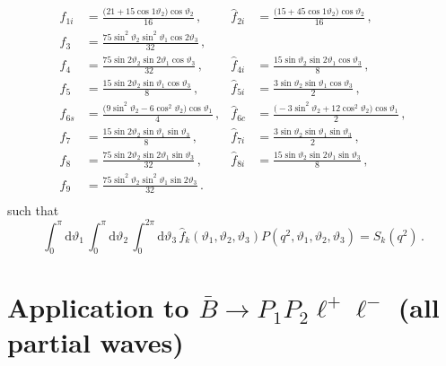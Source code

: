\documentclass[aps,prd,reprint,nofootinbib,preprintnumbers]{revtex4}
\newcommand{\rmdx}[1]{\mbox{d} #1 \,} %
\renewcommand{\theta}{\vartheta}
\begin{document}
\begin{equation}
\begin{aligned}
    \hat{f}_{1i} & = \frac{\big(21 + 15 \cos1\theta_2\big)\cos\theta_2}{16}               \,,&
    \hat{f}_{2i} & = \frac{\big(15 + 45 \cos1\theta_2\big)\cos\theta_2}{16}               \,,\\
    \hat{f}_{3}  & = \frac{75 \sin^2\theta_2 \sin^2\theta_1 \cos2\theta_3}{32}                \,,& &\\
    \hat{f}_{4}  & = \frac{75 \sin 2\theta_2 \sin 2\theta_1 \cos \theta_3}{32}                \,,&
    \hat{f}_{4i} & = \frac{15 \sin  \theta_2 \sin 2\theta_1 \cos \theta_3}{8}                 \,,\\
    \hat{f}_{5}  & = \frac{15 \sin 2\theta_2 \sin  \theta_1 \cos \theta_3}{8}                 \,,&
    \hat{f}_{5i} & = \frac{3  \sin  \theta_2 \sin  \theta_1 \cos \theta_3}{2}                 \,,\\
    \hat{f}_{6s} & = \frac{\big( 9\sin^2\theta_2 -  6 \cos^2\theta_2\big)\cos\theta_1}{4} \,,&
    \hat{f}_{6c} & = \frac{\big(-3\sin^2\theta_2 + 12 \cos^2\theta_2\big)\cos\theta_1}{2} \,,\\
    \hat{f}_{7}  & = \frac{15 \sin 2\theta_2 \sin  \theta_1 \sin \theta_3}{8}                 \,,&
    \hat{f}_{7i} & = \frac{3  \sin  \theta_2 \sin  \theta_1 \sin \theta_3}{2}                 \,,\\
    \hat{f}_{8}  & = \frac{75 \sin 2\theta_2 \sin 2\theta_1 \sin \theta_3}{32}                \,,&
    \hat{f}_{8i} & = \frac{15 \sin  \theta_2 \sin 2\theta_1 \sin \theta_3}{8}                 \,,\\
    \hat{f}_{9}  & = \frac{75 \sin^2\theta_2 \sin^2\theta_1 \sin2\theta_3}{32}                \,.\\
\end{aligned}
\end{equation}
such that
\begin{equation}
    \int_0^\pi \rmdx{\theta_1} \int_0^\pi \rmdx{\theta_2} \int_0^{2\pi} \rmdx{\theta_3} \hat{f}_k(\theta_1,\theta_2,\theta_3) P(q^2, \theta_1,\theta_2,\theta_3) = S_k(q^2)\,.
\end{equation}

\section{Application to $\bar{B}\to P_1 P_2\ell^+\ell^-$ (all partial waves)}
\label{app:btokpill}
\end{document}
